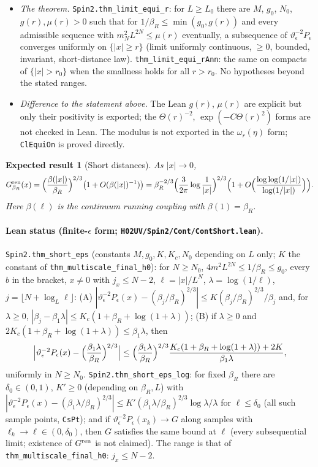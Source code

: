 \documentclass[11pt]{amsart}
\newtheorem{conjecture}[theorem]{Expected result}
\theoremstyle{definition}
\theoremstyle{remark}
\numberwithin{equation}{section}
\begin{document}
\begin{itemize}
\item \emph{The theorem.} \texttt{Spin2.thm\_limit\_equi\_r}: for $L\ge L_0$ there are $M$, $g_0$, $N_0$, $g(r),\mu(r)>0$ such
that for $1/\beta_R\le\min(g_0,g(r))$ and every admissible sequence with $m_N^2L^{2N}\le\mu(r)$ eventually, a subsequence
of $\vartheta_\epsilon^{-2}P_\epsilon$ converges uniformly on $\{|x|\ge r\}$ (limit uniformly continuous, $\ge0$, bounded,
invariant, short-distance law). \texttt{thm\_limit\_equi\_rAnn}: the same on compacts of $\{|x|>r_0\}$ when the smallness
holds for all $r>r_0$. No hypotheses beyond the stated ranges.
\item \emph{Difference to the statement above.} The Lean $g(r)$, $\mu(r)$ are explicit but only their positivity is
exported; the $\Theta(r)^{-2}$, $\exp(-C\Theta(r)^2)$ forms are not checked in Lean. The modulus is not exported in the
$\omega_r(\eta)$ form; \texttt{ClEquiOn} is proved directly.
\end{itemize}

\begin{conjecture}[Short distances]\label{thm:short}
As $|x|\to0$,
\[
  G^{\rm ren}_{\beta_R}(x)=\Bigl(\frac{\beta(|x|)}{\beta_R}\Bigr)^{2/3}\bigl(1+O(\beta(|x|)^{-1})\bigr)
  =\beta_R^{-2/3}\Bigl(\frac{3}{2\pi}\log\frac1{|x|}\Bigr)^{2/3}\Bigl(1+O\Bigl(\frac{\log\log(1/|x|)}{\log(1/|x|)}\Bigr)\Bigr).
\]
Here $\beta(\ell)$ is the continuum running coupling with $\beta(1)=\beta_R$.
\end{conjecture}

\paragraph{Lean status (finite-$\epsilon$ form; \texttt{H02UV/Spin2/Cont/ContShort.lean}).}
\texttt{Spin2.thm\_short\_eps} (constants $M,g_0,K,K_c,N_0$ depending on $L$ only; $K$ the constant of
\texttt{thm\_multiscale\_final\_h0}): for $N\ge N_0$, $4m^2L^{2N}\le1/\beta_R\le g_0$, every $b$ in the
bracket, $x\ne0$ with $j_x\le N-2$, $\ell=|x|/L^N$, $\lambda=\log(1/\ell)$, $j=\lfloor N+\log_L\ell\rfloor$:
(A) $|\vartheta_\epsilon^{-2}P_\epsilon(x)-(\beta_j/\beta_R)^{2/3}|\le K(\beta_j/\beta_R)^{2/3}/\beta_j$
and, for $\lambda\ge0$, $|\beta_j-\beta_1\lambda|\le K_c(1+\beta_R+\log(1+\lambda))$;
(B) if $\lambda\ge0$ and $2K_c(1+\beta_R+\log(1+\lambda))\le\beta_1\lambda$, then
\[
\Bigl|\vartheta_\epsilon^{-2}P_\epsilon(x)-\Bigl(\frac{\beta_1\lambda}{\beta_R}\Bigr)^{2/3}\Bigr|\le
\Bigl(\frac{\beta_1\lambda}{\beta_R}\Bigr)^{2/3}\frac{K_c(1+\beta_R+\log(1+\lambda))+2K}{\beta_1\lambda},
\]
uniformly in $N\ge N_0$. \texttt{Spin2.thm\_short\_eps\_log}: for fixed $\beta_R$ there are
$\delta_0\in(0,1)$, $K'\ge0$ (depending on $\beta_R,L$) with
$|\vartheta_\epsilon^{-2}P_\epsilon(x)-(\beta_1\lambda/\beta_R)^{2/3}|\le K'(\beta_1\lambda/\beta_R)^{2/3}\log\lambda/\lambda$
for $\ell\le\delta_0$ (all such sample points, \texttt{CsPt}); and if
$\vartheta_\epsilon^{-2}P_\epsilon(x_k)\to G$ along samples with $\ell_k\to\ell\in(0,\delta_0)$, then $G$
satisfies the same bound at $\ell$ (every subsequential limit; existence of $G^{\rm ren}$ is not
claimed). The range is that of \texttt{thm\_multiscale\_final\_h0}: $j_x\le N-2$.
\end{document}
